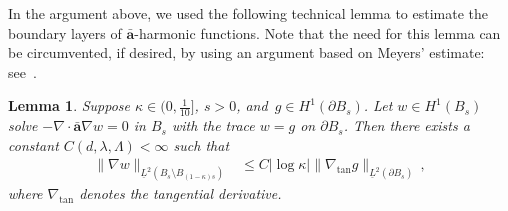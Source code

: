 \documentclass[11pt]{article} %
\numberwithin{equation}{section}
\newtheorem{lemma}[theorem]{Lemma}
\theoremstyle{definition}
\renewcommand{\a}{\mathbf{a}}
\newcommand{\ahom}{\bar{\a}}
\begin{document}
In the argument above, we used the following technical lemma to estimate the boundary layers of $\ahom$-harmonic functions. Note that the need for this lemma can be circumvented, if desired, by using an argument based on Meyers' estimate: see~\cite{AKMBook}. 

\begin{lemma} \label{l.bndrlayer}
Suppose $\kappa \in (0,\frac1{10}]$, $s >0$, and~$g \in H^{1}(\partial B_{s})$. Let $w \in H^1(B_s)$ solve $-\nabla \cdot \ahom \nabla w = 0$ in $B_s$ with the trace $w = g$ on $\partial B_s$. Then there exists a constant $C(d,\lambda,\Lambda) < \infty$ such that 
\begin{align}  \label{e.homog.bndrlayer}
\| \nabla w \|_{\underline{L}^2(B_{s} \setminus B_{(1-\kappa)s})} 
& \leq 
C |\log \kappa|   \| \nabla_{\mathrm{tan}} g \|_{\underline{L}^2(\partial B_{s})}  
\,,
\end{align}
where $\nabla_{\mathrm{tan}}$ denotes the tangential derivative. 
\end{lemma}
\end{document}
